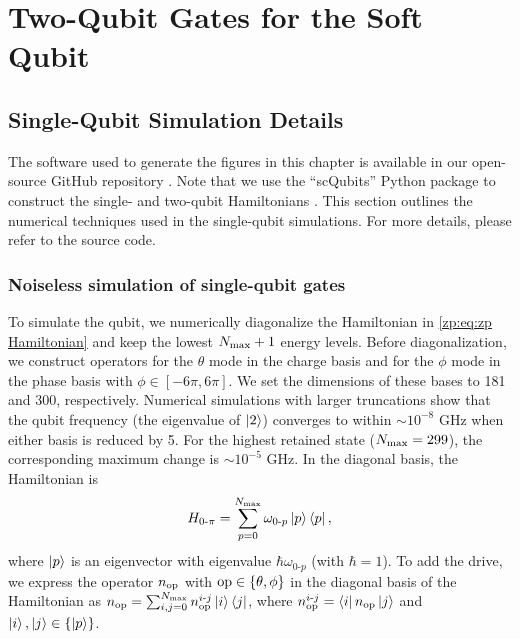 
\chapter{Two-Qubit Gates for the Soft \zps Qubit}\label{apx:chp_zero_pi}

\section{Single-Qubit Simulation Details}\label{zp:app:1Qgate_simulation}
The software used to generate the figures in this chapter is available in our open-source GitHub repository \cite{zp2q_repo}.
Note that we use the ``scQubits'' Python package to construct the single- and two-qubit Hamiltonians \cite{groszkowskiScqubitsPythonPackage2021a,chittaComputeraidedQuantizationNumerical2022a}.
This section outlines the numerical techniques used in the single-qubit simulations.
For more details, please refer to the source code.

\subsection{Noiseless simulation of single-qubit gates}
To simulate the \zps qubit, we numerically diagonalize the Hamiltonian in \cref{zp:eq:zp Hamiltonian} and keep the lowest $N_{\rm max} +1$ energy levels.
Before diagonalization, we construct operators for the $\theta$ mode in the charge basis and for the $\phi$ mode in the phase basis with $\phi \in \left[-6\pi, 6\pi \right]$.
We set the dimensions of these bases to 181 and 300, respectively.
Numerical simulations with larger truncations show that the qubit frequency (the eigenvalue of $\ket{2}$) converges to within $\sim 10^{-8}$ GHz when either basis is reduced by 5.
For the highest retained state ($N_{\rm max}=299$), the corresponding maximum change is $\sim 10^{-5}$ GHz.
In the diagonal basis, the \zps Hamiltonian is
\begin{equation}
H_{0\text{-}\pi} = \sum_{p=0}^{N_{\rm max}} \omega_{0 \text{-} p} \ket{p} \bra{p},
\end{equation}
where $\ket{p}$ is an eigenvector with eigenvalue $\hbar \omega_{0 \text{-} p}$ (with $\hbar=1$).
To add the drive, we express the operator $n_{\rm op}$ with ${\rm op} \in \{\theta, \phi\}$ in the diagonal basis of the \zps Hamiltonian as $n_{\rm op} = \sum_{i,j=0}^{N_{\rm max}} n^{i \text{-} j}_{\rm op} \ket{i} \bra{j}$, where $n^{i \text{-} j}_{\rm op} = \bra{i} n_{\rm op} \ket{j}$ and $\ket{i}, \ket{j} \in \{\ket{p}\}$.

